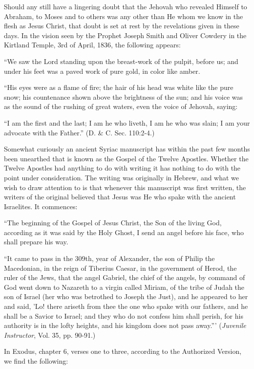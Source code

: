Should any still have a lingering doubt that the Jehovah who revealed Himself to Abraham,
to Moses and to others was any other than He whom we know in the flesh as Jesus Christ,
that doubt is set at rest by the revelations given in these days. In the vision seen by the
Prophet Joseph Smith and Oliver Cowdery in the Kirtland Temple, 3rd of April, 1836, the
following appears:

``We saw the Lord standing upon the breast-work of the pulpit, before us; and under his feet
was a paved work of pure gold, in color like amber.

``His eyes were as a flame of fire; the hair of his head was white like the pure snow; his
countenance shown above the brightness of the sun; and his voice was as the sound of the
rushing of great waters, even the voice of Jehovah, saying:

``I am the first and the last; I am he who liveth, I am he who was slain; I am your advocate
with the Father.'' (D. \& C. Sec. 110:2-4.)

Somewhat curiously an ancient Syriac manuscript has within the past few months been
unearthed that is known as the Gospel of the Twelve Apostles. Whether the Twelve Apostles
had anything to do with writing it has nothing to do with the point under consideration. The
writing was originally in Hebrew, and what we wish to draw attention to is that whenever
this manuscript was first written, the writers of the original believed that Jesus was He who
spake with the ancient Israelites. It commences:

``The beginning of the Gospel of Jesus Christ, the Son of the living God, according as it was
said by the Holy Ghost, I send an angel before his face, who shall prepare his way.

``It came to pass in the 309th, year of Alexander, the son of Philip the Macedonian, in the
reign of Tiberius Caesar, in the government of Herod, the ruler of the Jews, that the angel
Gabriel, the chief of the angels, by command of God went down to Nazareth to a virgin
called Miriam, of the tribe of Judah the son of Israel (her who was betrothed to Joseph the
Just), and he appeared to her and said, 'Lo! there ariseth from thee the one who spake with
our fathers, and he shall be a Savior to Israel; and they who do not confess him shall perish,
for his authority is in the lofty heights, and his kingdom does not pass away.''' (\textit{Juvenile
Instructor}, Vol. 35, pp. 90-91.)

In Exodus, chapter 6, verses one to three, according to the Authorized Version, we find the
following:

